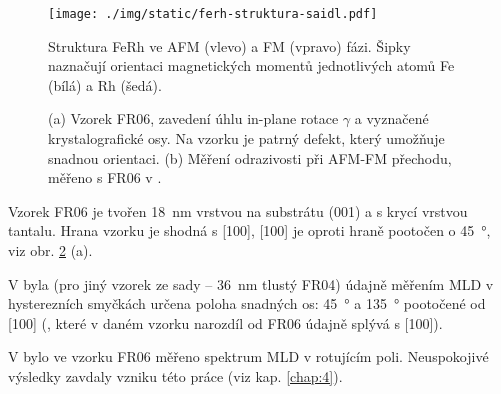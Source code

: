 \begin{figure}[htbp]
    \centering
    \texttt{[image: ./img/static/ferh-struktura-saidl.pdf]}
    \caption{Struktura FeRh ve AFM (vlevo) a FM (vpravo) fázi.
        Šipky naznačují orientaci magnetických momentů jednotlivých atomů Fe (bílá) a Rh (šedá). \cite{saidlInvestigationMagnetostructuralPhase2016}}
    \label{fig:ferh-struktura}
\end{figure}

\begin{figure}[htbp]
    \centering
    
    \caption{(a) Vzorek FR06, zavedení úhlu in-plane rotace $\gamma$ a vyznačené krystalografické osy.
    Na vzorku je patrný defekt, který umožňuje snadnou orientaci. (b) Měření odrazivosti při AFM-FM přechodu, měřeno s FR06 v \cite{kubascikMagnetooptickeStudiumAntiferomagnetickych2019}.}
    \label{fig:vzorek-ferh}
\end{figure}

Vzorek FR06 je tvořen \SI{18}{\nano\meter} vrstvou  na substrátu (001) a s krycí vrstvou tantalu.
Hrana vzorku je shodná s  [100],  [100] je oproti hraně pootočen o \SI{45}{\degree}, viz obr. \ref{fig:vzorek-ferh} (a).

V \cite{brajerLaserovaSpektroskopieMaterialu2015} byla (pro jiný vzorek ze sady -- \SI{36}{\nano\meter} tlustý FR04) údajně měřením MLD v hysterezních smyčkách určena poloha snadných os: \SI{45}{\degree} a \SI{135}{\degree} pootočené od  [100] (, které v daném vzorku narozdíl od FR06 údajně splývá s  [100]).

V \cite{kubascikMagnetooptickeStudiumAntiferomagnetickych2019} bylo ve vzorku FR06 měřeno spektrum MLD v rotujícím poli.
Neuspokojivé výsledky zavdaly vzniku této práce (viz kap. \ref{chap:4}).

